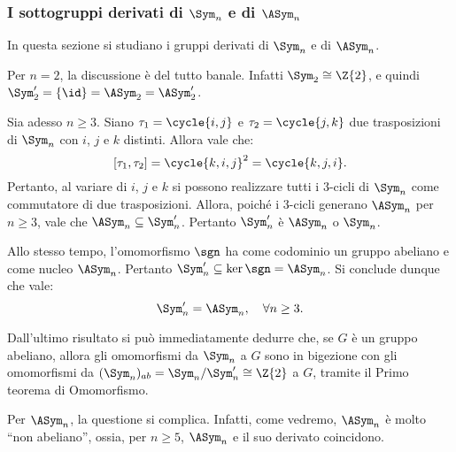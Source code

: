 \documentclass[11pt]{scrartcl}
\begin{document}
	\subsubsection{I sottogruppi derivati di $\Sym_n$ e di $\ASym_n$}
	
	In questa sezione si studiano i gruppi derivati di $\Sym_n$ e di
	$\ASym_n$. \medskip
	
	
	Per $n = 2$, la discussione è del tutto banale. Infatti
	$\Sym_2 \cong \Z{2}$, e quindi $\Sym_2' = \{\id\} = \ASym_2 = \ASym_2'$. \medskip
	
	
	Sia adesso $n \geq 3$. Siano $\tau_1 = \cycle{i,j}$ e $\tau_2 = \cycle{j,k}$ due trasposizioni
	di $\Sym_n$ con $i$, $j$ e $k$ distinti. Allora vale che:
	\[ [\tau_1, \tau_2] = \cycle{k, i, j}^2 = \cycle{k, j, i}. \]
	Pertanto, al variare di $i$, $j$ e $k$ si possono realizzare tutti i $3$-cicli
	di $\Sym_n$ come commutatore di due trasposizioni. Allora, poiché
	i $3$-cicli generano $\ASym_n$ per $n \geq 3$, vale che $\ASym_n \subseteq \Sym_n'$.
	Pertanto $\Sym_n'$ è $\ASym_n$ o $\Sym_n$. \medskip
	
	
	Allo stesso tempo, l'omomorfismo $\sgn$ ha come codominio un gruppo abeliano
	e come nucleo $\ASym_n$. Pertanto $\Sym_n' \subseteq \ker \sgn = \ASym_n$. Si
	conclude dunque che vale:
	\[ \Sym_n' = \ASym_n, \quad \forall n \geq 3. \]
	
	\begin{remark}
		Dall'ultimo risultato si può immediatamente dedurre che, se $G$ è
		un gruppo abeliano, allora gli omomorfismi da $\Sym_n$ a $G$ sono
		in bigezione con gli omomorfismi da $(\Sym_n)_{ab} = \Sym_n / \Sym_n' \cong \Z{2}$
		a $G$, tramite il Primo teorema di Omomorfismo.
	\end{remark}
	
	Per $\ASym_n$, la questione si complica. Infatti, come vedremo,
	$\ASym_n$ è molto ``non abeliano'', ossia, per $n \geq 5$,
	$\ASym_n$ e il suo derivato coincidono. \medskip
	
\end{document}
